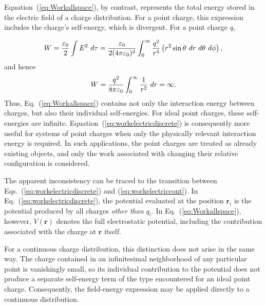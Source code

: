 			Equation~(\ref{eq:Workallspace}), by contrast, represents the total energy stored in the
			electric field of a charge distribution. For a point charge, this expression includes
			the charge's self-energy, which is divergent. For a point charge $q$,

			\[
				W
				=
				\frac{\varepsilon_0}{2}
				\int E^2\,\dd{\tau}
				=
				\frac{\varepsilon_0}{2(4\pi\varepsilon_0)^2}
				\int_0^\infty
				\frac{q^2}{r^4}
				\left(r^2\sin\theta\,\dd{r}\,\dd{\theta}\,\dd{\phi}\right),
			\]
			and hence
			\[
				W
				=
				\frac{q^2}{8\pi\varepsilon_0}
				\int_0^\infty \frac{1}{r^2}\,\dd{r}
				=
				\infty.
			\]
			Thus, Eq.~(\ref{eq:Workallspace}) contains not only the interaction energy between charges,
			but also their individual self-energies. For ideal point charges, these self-energies are
			infinite. Equation~(\ref{eq:workelectricdiscrete}) is consequently more useful for systems 
			of point charges when only the physically relevant interaction energy is required. In such
			applications, the point charges are treated as already existing objects, and only the work 
			associated with changing their relative configuration is considered.

			The apparent inconsistency can be traced to the transition between Eqs.~(\ref{eq:workelectricdiscrete}) 
			and (\ref{eq:workelectriccont}). In Eq.~(\ref{eq:workelectricdiscrete}), the potential evaluated
			at the position $\mathbf r_i$ is the potential produced by all charges \textit{other than}
			$q_i$. In Eq.~(\ref{eq:Workallspace}), however, $V(\mathbf r)$ denotes the full electrostatic
			potential, including the contribution associated with the charge at $\mathbf r$ itself.

			For a continuous charge distribution, this distinction does not arise in the same way. The
			charge contained in an infinitesimal neighborhood of any particular point is vanishingly
			small, so its individual contribution to the potential does not produce a separate self-energy
			term of the type encountered for an ideal point charge. Consequently, the field-energy expression
			may be applied directly to a continuous distribution.

